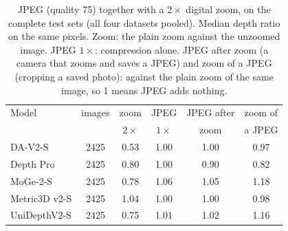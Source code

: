 \begin{table}[t]\centering\small
\caption{JPEG (quality 75) together with a $2\times$ digital zoom, on the complete test sets (all four datasets pooled). Median depth ratio on the same pixels. Zoom: the plain zoom against the unzoomed image. JPEG $1\times$: compression alone. JPEG after zoom (a camera that zooms and saves a JPEG) and zoom of a JPEG (cropping a saved photo): against the plain zoom of the same image, so 1 means JPEG adds nothing.}\label{tab:jpegzoom}
\setlength{\tabcolsep}{3pt}
\begin{tabular}{lccccc}\toprule
Model & images & zoom & JPEG & JPEG after & zoom of \\
 & & $2\times$ & $1\times$ & zoom & a JPEG \\ \midrule
DA-V2-S & 2425 & 0.53 & 1.00 & 1.00 & 0.97 \\
Depth Pro & 2425 & 0.80 & 1.00 & 0.90 & 0.82 \\
MoGe-2-S & 2425 & 0.78 & 1.06 & 1.05 & 1.18 \\
Metric3D v2-S & 2425 & 1.04 & 1.00 & 1.00 & 0.98 \\
UniDepthV2-S & 2425 & 0.75 & 1.01 & 1.02 & 1.16 \\
\bottomrule\end{tabular}\end{table}
